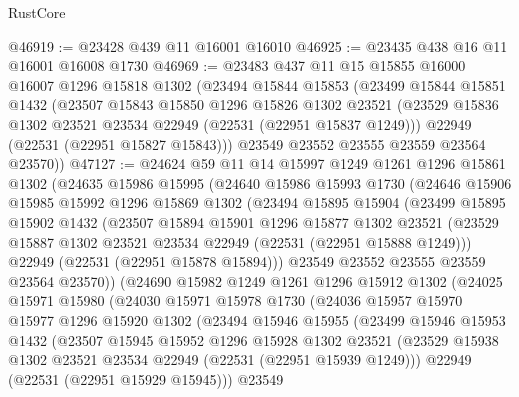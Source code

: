 \begin{lexlean}{RustCore}
\begin{coremodule}
@46919 := @23428 @439 @11 @16001 @16010
@46925 := @23435 @438 @16 @11 @16001 @16008 @1730
@46969 := @23483
    @437
    @11
    @15
    @15855
    @16000
    @16007
    @1296
    @15818
    @1302
    (@23494
      @15844
      @15853
      (@23499
        @15844
        @15851
        @1432
        (@23507
          @15843
          @15850
          @1296
          @15826
          @1302
          @23521
          (@23529 @15836 @1302 @23521 @23534 @22949 (@22531 (@22951 @15837 @1249)))
          @22949
          (@22531 (@22951 @15827 @15843)))
        @23549
        @23552
        @23555
        @23559
        @23564
        @23570))
@47127 := @24624
    @59
    @11
    @14
    @15997
    @1249
    @1261
    @1296
    @15861
    @1302
    (@24635
      @15986
      @15995
      (@24640
        @15986
        @15993
        @1730
        (@24646
          @15906
          @15985
          @15992
          @1296
          @15869
          @1302
          (@23494
            @15895
            @15904
            (@23499
              @15895
              @15902
              @1432
              (@23507
                @15894
                @15901
                @1296
                @15877
                @1302
                @23521
                (@23529 @15887 @1302 @23521 @23534 @22949 (@22531 (@22951 @15888 @1249)))
                @22949
                (@22531 (@22951 @15878 @15894)))
              @23549
              @23552
              @23555
              @23559
              @23564
              @23570))
          (@24690
            @15982
            @1249
            @1261
            @1296
            @15912
            @1302
            (@24025
              @15971
              @15980
              (@24030
                @15971
                @15978
                @1730
                (@24036
                  @15957
                  @15970
                  @15977
                  @1296
                  @15920
                  @1302
                  (@23494
                    @15946
                    @15955
                    (@23499
                      @15946
                      @15953
                      @1432
                      (@23507
                        @15945
                        @15952
                        @1296
                        @15928
                        @1302
                        @23521
                        (@23529 @15938 @1302 @23521 @23534 @22949 (@22531 (@22951 @15939 @1249)))
                        @22949
                        (@22531 (@22951 @15929 @15945)))
                      @23549

\end{coremodule}
\end{lexlean}
